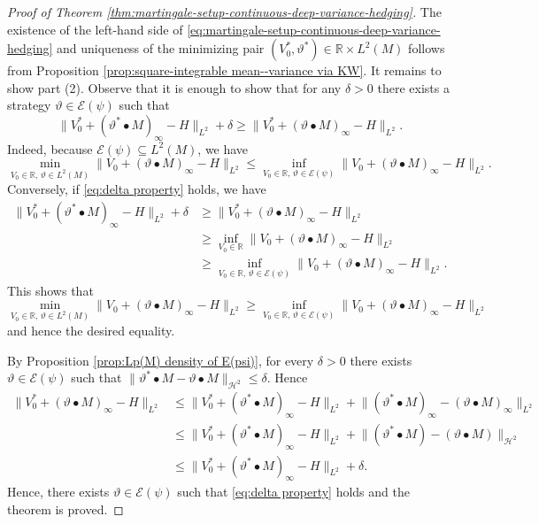 \documentclass[11pt,a4paper,twoside,openany]{report}
\numberwithin{equation}{section}
\theoremstyle{plain} %
\theoremstyle{definition} %
\theoremstyle{remark} %
\begin{document}
\begin{proof}[Proof of Theorem \ref{thm:martingale-setup-continuous-deep-variance-hedging}]
    The existence of the left-hand side of \eqref{eq:martingale-setup-continuous-deep-variance-hedging} and uniqueness of the minimizing pair \((V_0^*,\vartheta^*)\in \mathbb{R}\times L^2(M)\) follows from Proposition \ref{prop:square-integrable mean--variance via KW}. It remains to show part (2). Observe that it is enough to show that for any \(\delta>0\) there exists a strategy \(\vartheta\in\mathcal{E}(\psi)\) such that 
    \begin{equation}\label{eq:delta property}
       \lVert V_0^*+(\vartheta^*\bullet M)_{\infty}-H\rVert_{L^2}+\delta\geq \lVert V_0^*+(\vartheta\bullet M)_{\infty}-H\rVert_{L^2}.
    \end{equation}
Indeed, because \(\mathcal{E}(\psi)\subseteq L^2(M)\), we have 
\begin{equation*}
    \min_{V_0\in\mathbb{R},\,\vartheta\in L^2(M)}\lVert V_0+(\vartheta\bullet M)_{\infty}-H\rVert_{L^2}\leq \inf_{V_0\in\mathbb{R},\,\vartheta\in\mathcal{E}(\psi)}\lVert V_0+(\vartheta\bullet M)_{\infty}-H\rVert_{L^2}.
\end{equation*}
Conversely, if \eqref{eq:delta property} holds, we have
\begin{align*}
\lVert V_0^*+(\vartheta^*\bullet M)_{\infty}-H\rVert_{L^2}+\delta
     &\geq \lVert V_0^*+(\vartheta\bullet M)_{\infty}-H\rVert_{L^2}
     \\&\geq\inf_{V_0\in\mathbb{R}}\lVert V_0+(\vartheta\bullet M)_{\infty}-H\rVert_{L^2}
     \\&\geq \inf_{V_0\in\mathbb{R},\,\vartheta\in\mathcal{E}(\psi)}\lVert V_0+(\vartheta\bullet M)_{\infty}-H\rVert_{L^2}.
\end{align*}
This shows that 
\begin{equation*}
    \min_{V_0\in\mathbb{R},\,\vartheta\in L^2(M)}\lVert V_0+(\vartheta\bullet M)_{\infty}-H\rVert_{L^2}\geq\inf_{V_0\in\mathbb{R},\,\vartheta\in\mathcal{E}(\psi)}\lVert V_0+(\vartheta\bullet M)_{\infty}-H\rVert_{L^2}
\end{equation*}
and hence the desired equality.


    By Proposition \ref{prop:Lp(M) density of E(psi)}, for every \(\delta>0\) there exists \(\vartheta\in\mathcal{E}(\psi)\) such that \(\lVert \vartheta
    ^*\bullet M-\vartheta\bullet M\rVert_{\mathcal{H}^2}\leq\delta\). Hence
    \begin{align*}
        \lVert V_0^*+(\vartheta\bullet M)_{\infty}-H\rVert_{L^2}&\leq\lVert V_0^*+(\vartheta^*\bullet M)_{\infty}-H\rVert_{L^2}+\lVert (\vartheta^*\bullet M)_{\infty}-(\vartheta\bullet M)_{\infty}\rVert_{L^2}\\
        &\leq\lVert V_0^*+(\vartheta^*\bullet M)_{\infty}-H\rVert_{L^2}+\lVert (\vartheta^*\bullet M)-(\vartheta\bullet M)\rVert_{\mathcal{H}^2}
        \\&\leq\lVert V_0^*+(\vartheta^*\bullet M)_{\infty}-H\rVert_{L^2}+\delta.
    \end{align*}
    Hence, there exists \(\vartheta\in\mathcal{E}(\psi)\) such that \eqref{eq:delta property} holds and the theorem is proved.
\end{proof}
\end{document}
